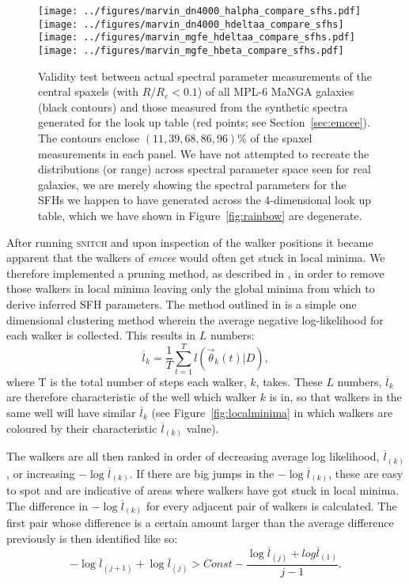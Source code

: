 \documentclass[useAMS,usenatbib]{mn2e}
\begin{document}
\begin{figure*}
\centering
\texttt{[image: ../figures/marvin\_dn4000\_halpha\_compare\_sfhs.pdf]}
\texttt{[image: ../figures/marvin\_dn4000\_hdeltaa\_compare\_sfhs]}
\texttt{[image: ../figures/marvin\_mgfe\_hdeltaa\_compare\_sfhs.pdf]}
\texttt{[image: ../figures/marvin\_mgfe\_hbeta\_compare\_sfhs.pdf]}
\caption{Validity test between actual spectral parameter measurements of the central spaxels (with $R/R_e < 0.1$) of all MPL-6 MaNGA galaxies (black contours) and those measured from the synthetic spectra generated for the look up table (red points; see Section~\ref{sec:emcee}). The contours enclose $(11, 39, 68, 86, 96)\%$ of the spaxel measurements in each panel. We have not attempted to recreate the distributions (or range) across spectral parameter space seen for real galaxies, we are merely showing the spectral parameters for the SFHs we happen to have generated across the 4-dimensional look up table, which we have shown in Figure~\ref{fig:rainbow} are degenerate.}
\label{fig:compare_manga_specmeas}
\end{figure*}


After running \textsc{snitch} and upon inspection of the walker positions it became apparent that the walkers of \emph{emcee} would often get stuck in local minima. We therefore implemented a pruning method, as described in \cite{hou12}, in order to remove those walkers in local minima leaving only the global minima from which to derive inferred SFH parameters. The method outlined in \cite{hou12} is a simple one dimensional clustering method wherein the average negative log-likelihood for each walker is collected. This results in $L$ numbers:
\begin{equation}\label{eq:lnumbers}
\overline{l}_k = \frac{1}{T} \sum^{T}_{t=1} l(\vec{\theta}_k(t)|D),
\end{equation}
where T is the total number of steps each walker, $k$, takes. These $L$ numbers, $\overline{l}_k$ are therefore characteristic of the well which walker $k$ is in, so that walkers in the same well will have similar $\overline{l}_k$ (see Figure~\ref{fig:localminima} in which walkers are coloured by their characteristic $\overline{l}_{(k)}$ value). 


The walkers are all then ranked in order of decreasing average log likelihood, $\overline{l}_{(k)}$, or increasing $- \log \overline{l}_{(k)}$. If there are big jumps in the $- \log \overline{l}_{(k)}$, these are easy to spot and are indicative of areas where walkers have got stuck in local minima. The difference in $- \log \overline{l}_{(k)}$ for every adjacent pair of walkers is calculated. The first pair whose difference is a certain amount larger than the average difference previously is then identified like so:
\begin{equation}\label{eq:idprunes}
-\log \overline{l}_{(j+1)} + \log \overline{l}_{(j)} > Const − \frac{\log \overline{l}_{(j)} + log \overline{l}_{(1)}}{j - 1}.
\end{equation}
\end{document}

